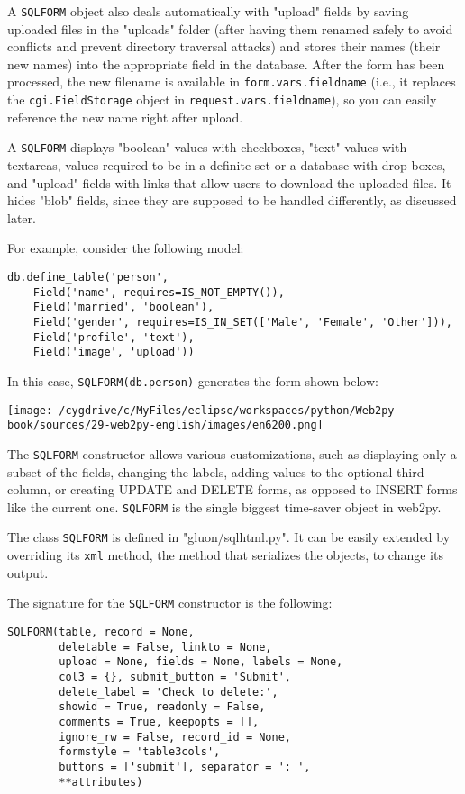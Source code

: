 \documentclass[justified,sixbynine,notoc]{tufte-book}
\def\ft{\small\tt}
\def\inxx#1{\index{#1}}
\begin{document}
\begin{fullwidth}
A {\ft SQLFORM} object also deals automatically with "upload" fields by saving uploaded files in the "uploads" folder (after having them renamed safely to avoid conflicts and prevent directory traversal attacks) and stores their names (their new names) into the appropriate field in the database. After the form has been processed, the new filename is available in {\ft form.vars.fieldname} (i.e., it replaces the {\ft cgi.FieldStorage} object in {\ft request.vars.fieldname}), so you can easily reference the new name right after upload.

A {\ft SQLFORM} displays "boolean" values with checkboxes, "text" values with textareas, values required to be in a definite set or a database with drop-boxes, and "upload" fields with links that allow users to download the uploaded files. It hides "blob" fields, since they are supposed to be handled differently, as discussed later.

For example, consider the following model:
\begin{lstlisting}
db.define_table('person',
    Field('name', requires=IS_NOT_EMPTY()),
    Field('married', 'boolean'),
    Field('gender', requires=IS_IN_SET(['Male', 'Female', 'Other'])),
    Field('profile', 'text'),
    Field('image', 'upload'))
\end{lstlisting}

In this case, {\ft SQLFORM(db.person)} generates the form shown below:


\goodbreak\begin{center}\texttt{[image: /cygdrive/c/MyFiles/eclipse/workspaces/python/Web2py-book/sources/29-web2py-english/images/en6200.png]}\end{center}


The {\ft SQLFORM} constructor allows various customizations, such as displaying only a subset of the fields, changing the labels, adding values to the optional third column, or creating UPDATE and DELETE forms, as opposed to INSERT forms like the current one.
{\ft SQLFORM} is the single biggest time-saver object in web2py.

The class {\ft SQLFORM} is defined in "gluon/sqlhtml.py". It can be easily extended by overriding its {\ft xml} method, the method that serializes the objects, to change its output.

\inxx{fields} \inxx{labels}
The signature for the {\ft SQLFORM} constructor is the following:
\begin{lstlisting}
SQLFORM(table, record = None,
        deletable = False, linkto = None,
        upload = None, fields = None, labels = None,
        col3 = {}, submit_button = 'Submit',
        delete_label = 'Check to delete:',
        showid = True, readonly = False,
        comments = True, keepopts = [],
        ignore_rw = False, record_id = None,
        formstyle = 'table3cols',
        buttons = ['submit'], separator = ': ',
        **attributes)


\end{lstlisting}
\end{fullwidth}
\end{document}
